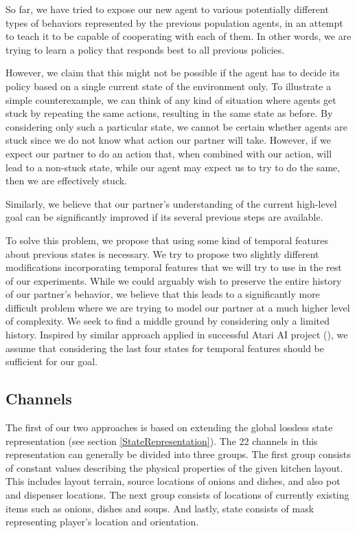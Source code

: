 So far, we have tried to expose our new agent to various potentially different types of behaviors represented by the previous population agents, in an attempt to teach it to be capable of cooperating with each of them.
In other words, we are trying to learn a policy that responds best to all previous policies.

However, we claim that this might not be possible if the agent has to decide its policy based on a single current state of the environment only.
To illustrate a simple counterexample, we can think of any kind of situation where agents get stuck by repeating the same actions, resulting in the same state as before.
By considering only such a particular state, we cannot be certain whether agents are stuck since we do not know what action our partner will take.
However, if we expect our partner to do an action that, when combined with our action, will lead to a non-stuck state, while our agent may expect us to try to do the same, then we are effectively stuck.

Similarly, we believe that our partner's understanding of the current high-level goal can be significantly improved if its several previous steps are available.

To solve this problem, we propose that using some kind of temporal features about previous states is necessary.
We try to propose two slightly different modifications incorporating temporal features that we will try to use in the rest of our experiments.
While we could arguably wish to preserve the entire history of our partner's behavior, we believe that this leads to a significantly more difficult problem where we are trying to model our partner at a much higher level of complexity.
We seek to find a middle ground by considering only a limited history.
Inspired by similar approach applied in successful Atari AI project (\cite{Atari}), we assume that considering the last four states for temporal features should be sufficient for our goal.


\subsection{Channels}
The first of our two approaches is based on extending the global lossless state representation (see section \ref{StateRepresentation}).
The 22 channels in this representation can generally be divided into three groups.
The first group consists of constant values describing the physical properties of the given kitchen layout. 
This includes layout terrain, source locations of onions and dishes, and also pot and dispenser locations.
The next group consists of locations of currently existing items such as onions, dishes and soups.
And lastly, state consists of mask representing player's location and orientation.

